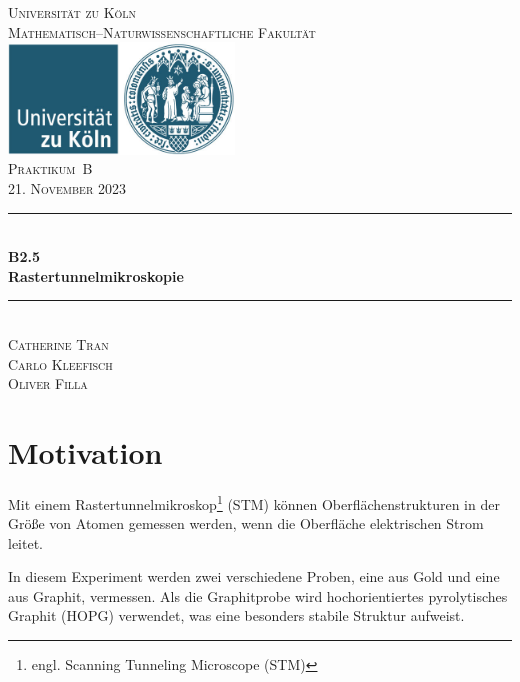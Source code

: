 \documentclass[12pt,a4paper]{scrartcl}
\numberwithin{equation}{section} %
\newcommand{\HRule}{\rule{\linewidth}{0.7mm}}
\begin{document}
\begin{titlepage}
	\pagestyle{empty}

	\begin{center}

	\textsc{\LARGE Universität zu Köln }\\ [0.4cm]
	\textsc{Mathematisch--Naturwissenschaftliche Fakultät} \\[1.5cm]

	\includegraphics[width=0.45\textwidth]{../media/uni.jpg}\\[1.5cm]  %

	\textsc{\Large Praktikum~B}\\[2mm]
	\textsc{21. November 2023}\\[10mm]
	\HRule \\[0.4cm]

		{	\Huge \bfseries B2.5}\\[0.4cm]
			{	\huge \bfseries Rastertunnelmikroskopie}\\[0.4cm]
			
	\HRule \\[3cm]

		\textsc{\Large Catherine Tran } \\[3pt]
		\textsc{\Large Carlo Kleefisch } \\[3pt]
		\textsc{\Large Oliver Filla } \\[3pt]
		
	\end{center}
\end{titlepage}

\newpage
\tableofcontents
\newpage

\hypertarget{motivation}{%
\section{Motivation}\label{motivation}}

Mit einem Rastertunnelmikroskop\footnote{engl. Scanning Tunneling  Microscope (STM)} (STM) können Oberflächenstrukturen in der Größe von Atomen gemessen werden, wenn die Oberfläche elektrischen Strom leitet.

In diesem Experiment werden zwei verschiedene Proben, eine aus Gold und eine aus Graphit, vermessen. Als die Graphitprobe wird hochorientiertes pyrolytisches Graphit (HOPG) verwendet, was eine besonders stabile Struktur aufweist.
\end{document}
